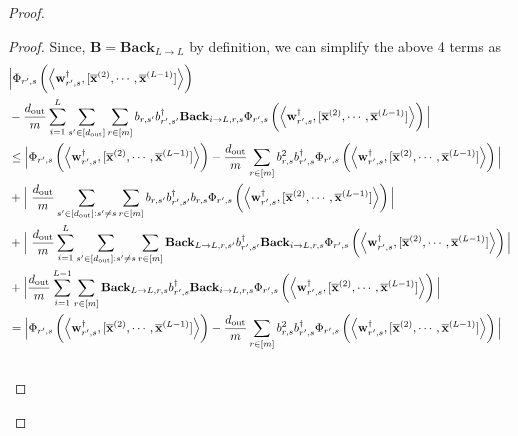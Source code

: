 \begin{claim}
\begin{proof}
\begin{proof}
				Since, $\mathbf{B} = \mathbf{Back}_{L \to L}$ by definition, we can simplify the above 4 terms as
				\begingroup \allowdisplaybreaks
				\begin{align}
					&\Big| \Phi_{r', s} \left(\left\langle \mathbf{w}_{r', s}^{\dagger}, [\overline{\mathbf{x}}^{(2)}, \cdots, \overline{\mathbf{x}}^{(L-1)}]\right\rangle\right) \\& - \frac{\dout }{m} \sum_{i=1}^{L}  \sum_{s' \in [\dout ]}  \sum_{r \in [m]}  b_{r, s'} b_{r', s'}^{\dagger} \mathbf{Back}_{i \to L, r, s} \Phi_{r', s} \left(\left\langle \mathbf{w}_{r', s}^{\dagger}, [\overline{\mathbf{x}}^{(2)}, \cdots, \overline{\mathbf{x}}^{(L-1)}]\right\rangle\right) \Big| \nonumber\\& 
					\le 
					\Big| \Phi_{r', s} \left(\left\langle \mathbf{w}_{r', s}^{\dagger}, [\overline{\mathbf{x}}^{(2)}, \cdots, \overline{\mathbf{x}}^{(L-1)}]\right\rangle\right)  - \frac{\dout }{m} \sum_{r \in [m]}  b^2_{r, s} b_{r', s}^{\dagger} \Phi_{r', s} \left(\left\langle \mathbf{w}_{r', s}^{\dagger}, [\overline{\mathbf{x}}^{(2)}, \cdots, \overline{\mathbf{x}}^{(L-1)}]\right\rangle\right) \Big| \nonumber\\&
					+ \Big| \ \frac{\dout }{m} \sum_{s'\in [\dout ]: s' \ne s} \sum_{r \in [m]}  b_{r, s'} b_{r', s'}^{\dagger} b_{r, s} \Phi_{r', s} \left(\left\langle \mathbf{w}_{r', s}^{\dagger}, [\overline{\mathbf{x}}^{(2)}, \cdots, \overline{\mathbf{x}}^{(L-1)}]\right\rangle\right) \Big| \nonumber\\&
					+ \Big| \ \frac{\dout }{m}  \sum_{i=1}^{L} \sum_{s'\in [\dout ]: s' \ne s} \sum_{r \in [m]}  \mathbf{Back}_{L \to L, r, s'} b_{r', s'}^{\dagger} \mathbf{Back}_{i \to L, r, s} \Phi_{r', s} \left(\left\langle \mathbf{w}_{r', s}^{\dagger}, [\overline{\mathbf{x}}^{(2)}, \cdots, \overline{\mathbf{x}}^{(L-1)}]\right\rangle\right) \Big| \nonumber\\&
					+ \Big|  \frac{\dout }{m} \sum_{i=1}^{L-1} \sum_{r \in [m]}  \mathbf{Back}_{L \to L, r, s}  b_{r', s}^{\dagger} \mathbf{Back}_{i \to L, r, s} \Phi_{r', s} \left(\left\langle \mathbf{w}_{r', s}^{\dagger}, [\overline{\mathbf{x}}^{(2)}, \cdots, \overline{\mathbf{x}}^{(L-1)}]\right\rangle\right) \Big| \nonumber\\&
					= \Big| \Phi_{r', s} \left(\left\langle \mathbf{w}_{r', s}^{\dagger}, [\overline{\mathbf{x}}^{(2)}, \cdots, \overline{\mathbf{x}}^{(L-1)}]\right\rangle\right)  - \frac{\dout }{m} \sum_{r \in [m]}  b^2_{r, s} b_{r', s}^{\dagger} \Phi_{r', s} \left(\left\langle \mathbf{w}_{r', s}^{\dagger}, [\overline{\mathbf{x}}^{(2)}, \cdots, \overline{\mathbf{x}}^{(L-1)}]\right\rangle\right) \Big| \label{eq:Comptosimple1}\\&

\end{align}
\end{proof}
\end{proof}
\end{claim}
